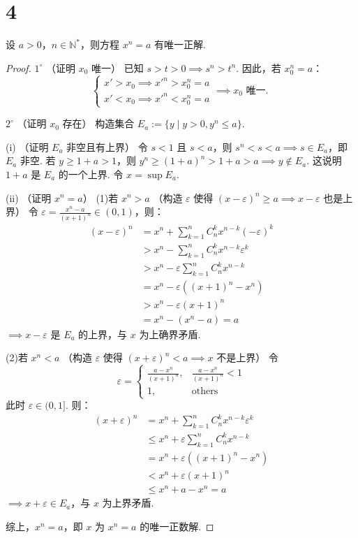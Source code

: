 \section{4}

\begin{theorem}[n次方根的存在唯一性]
    设 $a > 0$，$n \in \mathbb{N}^*$，则方程 $x^n = a$ 有唯一正解. 
\end{theorem}

\begin{proof}

$1^\circ$ （证明 $x_0$ 唯一）
已知 $s > t > 0 \implies s^n > t^n$. 因此，若 $x_0^n = a$：
$$
\begin{cases}
x' > x_0 \implies x'^n > x_0^n = a \\
x' < x_0 \implies x'^n < x_0^n = a
\end{cases}
\implies x_0 \text{ 唯一. }
$$

$2^\circ$ （证明 $x_0$ 存在）
构造集合 $E_a := \{ y \mid y > 0, y^n \le a \}$. 

(i) （证明 $E_a$ 非空且有上界）
令 $s < 1$ 且 $s < a$，则 $s^n < s < a \implies s \in E_a$，即 $E_a$ 非空. 
若 $y \ge 1+a > 1$，则 $y^n \ge (1+a)^n > 1+a > a \implies y \notin E_a$. 
这说明 $1+a$ 是 $E_a$ 的一个上界. 令 $x = \sup E_a$. 

(ii) （证明 $x^n = a$）
(1)若 $x^n > a$ （构造 $\varepsilon$ 使得 $(x-\varepsilon)^n \ge a \implies x-\varepsilon$ 也是上界）
令 $\varepsilon = \frac{x^n - a}{(x+1)^n} \in (0, 1)$，则：
$$
\begin{aligned}
(x-\varepsilon)^n &= x^n + \sum_{k=1}^n C_n^k x^{n-k} (-\varepsilon)^k \\
&> x^n - \sum_{k=1}^n C_n^k x^{n-k} \varepsilon^k \\
&> x^n - \varepsilon \sum_{k=1}^n C_n^k x^{n-k} \\
&= x^n - \varepsilon ((x+1)^n - x^n) \\
&> x^n - \varepsilon (x+1)^n \\
&= x^n - (x^n - a) = a
\end{aligned}
$$
$\implies x-\varepsilon$ 是 $E_a$ 的上界，与 $x$ 为上确界矛盾. 

(2)若 $x^n < a$ （构造 $\varepsilon$ 使得 $(x+\varepsilon)^n < a \implies x$ 不是上界）
令 
$$
\varepsilon = \begin{cases}
\frac{a - x^n}{(x+1)^n}, & \frac{a - x^n}{(x+1)^n} < 1 \\
1, & \text{others}
\end{cases}
$$
此时 $\varepsilon \in (0, 1]$. 则：
$$
\begin{aligned}
(x+\varepsilon)^n &= x^n + \sum_{k=1}^n C_n^k x^{n-k} \varepsilon^k \\
&\le x^n + \varepsilon \sum_{k=1}^n C_n^k x^{n-k} \\
&= x^n + \varepsilon ((x+1)^n - x^n) \\
&< x^n + \varepsilon (x+1)^n \\
&\le x^n + a - x^n = a
\end{aligned}
$$
$\implies x+\varepsilon \in E_a$，与 $x$ 为上界矛盾. 

综上，$x^n = a$，即 $x$ 为 $x^n = a$ 的唯一正数解. 
\end{proof}